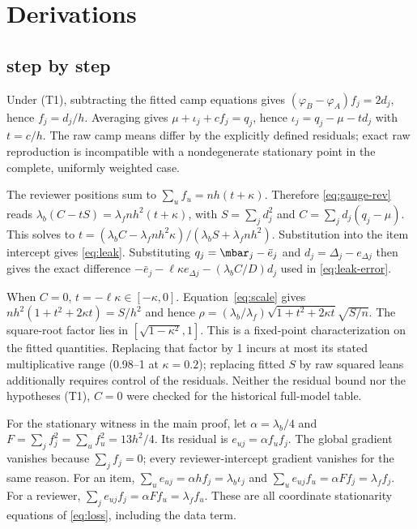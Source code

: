 \section{Derivations}\label{app:proofs}

\subsection{\texorpdfstring{}{The majoritarian-leak proposition} step by step}

Under (T1), subtracting the fitted camp equations gives
$(\varphi_B-\varphi_A)f_j=2d_j$, hence $f_j=d_j/h$. Averaging gives
$\mu+\iota_j+cf_j=q_j$, hence $\iota_j=q_j-\mu-t d_j$ with $t=c/h$.
The raw camp means differ by the explicitly defined residuals; exact raw reproduction is
incompatible with a nondegenerate stationary point in the complete, uniformly weighted case.

The reviewer positions sum to $\sum_uf_u=nh(t+\kappa)$. Therefore
\eqref{eq:gauge-rev} reads
$\lambda_b(C-tS)=\lambda_fnh^2(t+\kappa)$, with
$S=\sum_jd_j^2$ and $C=\sum_jd_j(q_j-\mu)$. This solves to
$t=(\lambda_b C-\lambda_fnh^2\kappa)/(\lambda_bS+\lambda_fnh^2)$.
Substitution into the item intercept gives \eqref{eq:leak}. Substituting
$q_j=\mbar_j-\bar e_j$ and $d_j=\Delta_j-e_{\Delta j}$ then gives the exact difference
$-\bar e_j-\ell\kappa e_{\Delta j}-(\lambda_bC/D)d_j$ used in \eqref{eq:leak-error}.

When $C=0$, $t=-\ell\kappa\in[-\kappa,0]$. Equation~\eqref{eq:scale} gives
$nh^2(1+t^2+2\kappa t)=S/h^2$ and hence
$\rho=(\lambda_b/\lambda_f)\sqrt{1+t^2+2\kappa t}\sqrt{S/n}$.
The square-root factor lies in $[\sqrt{1-\kappa^2},1]$. This is a fixed-point
characterization on the fitted quantities. Replacing that factor by 1 incurs at most its
stated multiplicative range (0.98--1 at $\kappa=0.2$); replacing fitted $S$ by raw squared
leans additionally requires control of the residuals. Neither the residual bound nor the
hypotheses (T1), $C=0$ were checked for the historical full-model table.

For the stationary witness in the main proof, let $\alpha=\lambda_b/4$ and
$F=\sum_j f_j^2=\sum_u f_u^2=13h^2/4$. Its residual is $e_{uj}=\alpha f_uf_j$.
The global gradient vanishes because $\sum_jf_j=0$; every reviewer-intercept gradient
vanishes for the same reason. For an item,
$\sum_u e_{uj}=\alpha h f_j=\lambda_b\iota_j$ and
$\sum_u e_{uj}f_u=\alpha Ff_j=\lambda_f f_j$.
For a reviewer, $\sum_j e_{uj}f_j=\alpha Ff_u=\lambda_f f_u$.
These are all coordinate stationarity equations of \eqref{eq:loss}, including the data term.

